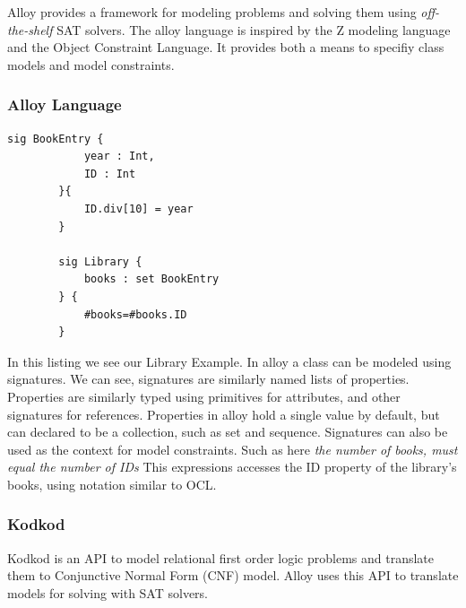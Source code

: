 
Alloy provides a framework for modeling problems and solving them using \textit{off-the-shelf} SAT solvers.
The alloy language is inspired by the Z modeling language and the Object Constraint Language.
It provides both a means to specifiy class models and model constraints.

\subsubsection{Alloy Language}
\begin{listing}[!h]
    \begin{lstlisting}[language=xml]
        sig BookEntry {
            year : Int,
            ID : Int
        }{
            ID.div[10] = year
        }

        sig Library {
            books : set BookEntry
        } {
            #books=#books.ID
        }
    \end{lstlisting}
    \caption{Minimal Object Model in the XMI-like format}
\end{listing}
In this listing we see our Library Example.
In alloy a class can be modeled using signatures.
We can see, signatures are similarly named lists of properties.
Properties are similarly typed using primitives for attributes, and other signatures for references. 
Properties in alloy hold a single value by default, but can declared to be a collection, such as set and sequence. 
Signatures can also be used as the context for model constraints.
Such as here \textit{the number of books, must equal the number of IDs}
This expressions accesses the ID property of the library's books, using notation similar to OCL.

\subsubsection{Kodkod}
Kodkod is an API to model relational first order logic problems and translate them to Conjunctive Normal Form (CNF) model.
Alloy uses this API to translate models for solving with SAT solvers.

